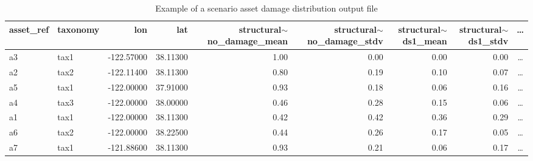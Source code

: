 \begin{table}[htbp]
\centering
\begin{tabular}{llrrrrrrc}
\hline
\rowcolor{lightgray}
\textbf{asset\_ref} & \textbf{taxonomy} & \textbf{lon} & \textbf{lat} & \textbf{structural$\sim$no\_damage\_mean} & \textbf{structural$\sim$no\_damage\_stdv} & \textbf{structural$\sim$ds1\_mean} & \textbf{structural$\sim$ds1\_stdv} & \ldots \\ \hline
a3 & tax1 & -122.57000 & 38.11300 & 1.00 & 0.00 & 0.00 & 0.00 & \ldots \\
a2 & tax2 & -122.11400 & 38.11300 & 0.80 & 0.19 & 0.10 & 0.07 & \ldots \\
a5 & tax1 & -122.00000 & 37.91000 & 0.93 & 0.18 & 0.06 & 0.16 & \ldots \\
a4 & tax3 & -122.00000 & 38.00000 & 0.46 & 0.28 & 0.15 & 0.06 & \ldots \\
a1 & tax1 & -122.00000 & 38.11300 & 0.42 & 0.42 & 0.36 & 0.29 & \ldots \\
a6 & tax2 & -122.00000 & 38.22500 & 0.44 & 0.26 & 0.17 & 0.05 & \ldots \\
a7 & tax1 & -121.88600 & 38.11300 & 0.93 & 0.21 & 0.06 & 0.17 & \ldots \\
\hline
\end{tabular}
\caption{Example of a scenario asset damage distribution output file}
\label{output:scenario_damage_asset}
\end{table}

